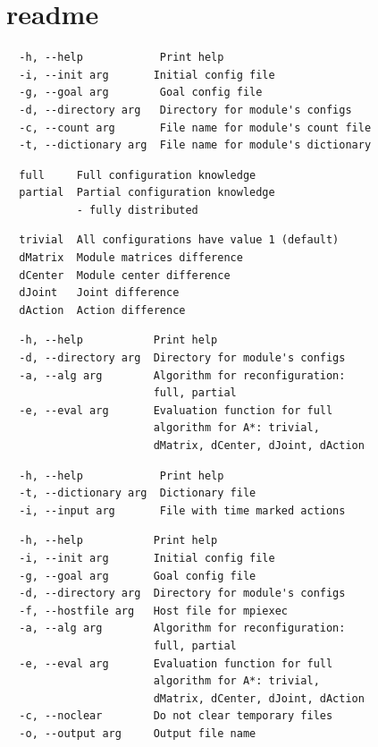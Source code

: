 \documentclass[
  digital, %
  oneside, %
  notable,   %
  lof,     %
  nolot,     %
]{fithesis3}
\begin{document}
\chapter{readme}
\label{sec:readme}
\begin{verbatim}
  -h, --help            Print help
  -i, --init arg       Initial config file
  -g, --goal arg        Goal config file
  -d, --directory arg   Directory for module's configs
  -c, --count arg       File name for module's count file
  -t, --dictionary arg  File name for module's dictionary
\end{verbatim}

\begin{verbatim}
  full     Full configuration knowledge
  partial  Partial configuration knowledge 
           - fully distributed
\end{verbatim}

\begin{verbatim}
  trivial  All configurations have value 1 (default)
  dMatrix  Module matrices difference
  dCenter  Module center difference
  dJoint   Joint difference
  dAction  Action difference
\end{verbatim} 

\begin{verbatim}
  -h, --help           Print help
  -d, --directory arg  Directory for module's configs
  -a, --alg arg        Algorithm for reconfiguration: 
                       full, partial
  -e, --eval arg       Evaluation function for full 
                       algorithm for A*: trivial, 
                       dMatrix, dCenter, dJoint, dAction
\end{verbatim}

\begin{verbatim}
  -h, --help            Print help
  -t, --dictionary arg  Dictionary file
  -i, --input arg       File with time marked actions 
\end{verbatim}

\begin{verbatim}
  -h, --help           Print help
  -i, --init arg       Initial config file
  -g, --goal arg       Goal config file
  -d, --directory arg  Directory for module's configs
  -f, --hostfile arg   Host file for mpiexec
  -a, --alg arg        Algorithm for reconfiguration: 
                       full, partial
  -e, --eval arg       Evaluation function for full 
                       algorithm for A*: trivial, 
                       dMatrix, dCenter, dJoint, dAction
  -c, --noclear        Do not clear temporary files
  -o, --output arg     Output file name
\end{verbatim}



\printbibliography[heading=bibintoc] %
\end{document}
